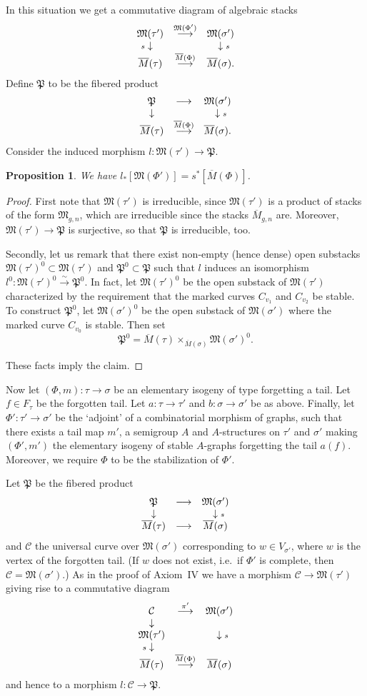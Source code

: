 \documentclass[11pt]{article}
\newcommand{\MM}{\mathfrak{M}}
\newcommand{\PP}{\mathfrak{P}}
\newcommand{\cC}{\mathcal{C}}
\newcommand{\comdia}[9]{
\begin{array}{ccc}
#1 & \stackrel{#2}{\longrightarrow} & #3 \\
\ldiag{#4} & #5 & \rdiag{#6} \\
#7 & \stackrel{#8}{\longrightarrow} & #9
\end{array}}
\newcommand{\iso}{\stackrel{\sim}{\rightarrow}}
\newcommand{\ldiag}[1]{\makebox[0cm]{\({\scriptstyle#1}\downarrow\phantom{\scriptstyle#1}\)}}
\newcommand{\lst}{_{\ast}}
\newcommand{\ol}{\overline}
\newcommand{\rdiag}[1]{\makebox[0cm]{\(\phantom{\scriptstyle#1}\downarrow{\scriptstyle#1}\)}}
\newcommand{\upst}{^{\ast}}
\theoremstyle{plain}
\newtheorem{prop}{Proposition}
\theoremstyle{remark}
\newenvironment{pf}{\begin{proof}}{\end{proof}}
\theoremstyle{plain}
\theoremstyle{definition}
\theoremstyle{remark}
\begin{document}
In this situation we get a commutative diagram of algebraic stacks
\[
\comdia{\MM(\tau')}{\MM(\Phi')}{\MM(\sigma')}{ s}{}{
s}{\ol{M}(\tau)}{\ol{M}(\Phi)}{\ol{M}(\sigma).}
\]
Define \(\PP\) to be the fibered product
\[
\comdia{\PP}{}{\MM(\sigma')}{ }{}{
s}{\ol{M}(\tau)}{\ol{M}(\Phi)}{\ol{M}(\sigma).}
\]
Consider the induced morphism \(l:\MM(\tau')\to\PP\).

\begin{prop} \label{evfa}
We have \(l\lst[\MM(\Phi')]=s\upst[\ol{M}(\Phi)]\).
\end{prop}
\begin{pf}
First note that \(\MM(\tau')\) is irreducible, since \(\MM(\tau')\) is a
product of stacks of the form \(\MM_{g,n}\), which are irreducible since
the stacks \(\ol{M}_{g,n}\) are. Moreover, \(\MM(\tau')\to\PP\) is
surjective, so that \(\PP\) is irreducible, too.

Secondly, let us remark that there exist non-empty (hence dense) open
substacks \(\MM(\tau')^0\subset\MM(\tau')\) and \(\PP^0\subset\PP\) such
that \(l\) induces an isomorphism \(l^0:\MM(\tau')^0\iso\PP^0\). In fact,
let \(\MM(\tau')^0\) be the open substack of \(\MM(\tau')\) characterized
by the requirement that the marked curves \(C_{v_1}\) and \(C_{v_2}\) be
stable. To construct \(\PP^0\), let \(\MM(\sigma')^0\) be the open
substack of \(\MM(\sigma')\) where the marked curve \(C_{v_0}\) is stable.
Then set
\[
\PP^0=\ol{M}(\tau)\times_{\ol{M}(\sigma)}\MM(\sigma')^0.
\]

These facts imply the claim.
\end{pf}

Now let \((\Phi,m):\tau\to \sigma\) be an elementary isogeny of type
forgetting a tail. Let \(f\in F_{\tau}\) be the forgotten tail. Let
\(a:\tau\to\tau'\) and \(b:\sigma\to\sigma'\) be as above. Finally, let
\(\Phi':\tau'\to\sigma'\) be the `adjoint' of a combinatorial morphism
of graphs, such that there exists a tail map \(m'\), a semigroup \(A\) and
\(A\)-structures on \(\tau'\) and \(\sigma'\) making \((\Phi',m')\) the
elementary isogeny of stable \(A\)-graphs forgetting the tail \(a(f)\).
Moreover, we require \(\Phi\) to be the stabilization of \(\Phi'\).

Let \(\PP\) be the fibered product
\[
\comdia{\PP}{}{\MM(\sigma')}{}{}{s}{\ol{M}(\tau)}{}{\ol{M}(\sigma)}
\]
and \(\cC\) the universal curve over \(\MM(\sigma')\) corresponding to
\(w\in V_{\sigma'}\), where \(w\) is the vertex of the forgotten tail. (If
\(w\) does not exist, i.e.\ if \(\Phi'\) is complete, then
\(\cC=\MM(\sigma')\).) As
in the proof of Axiom~IV we have a morphism \(\cC\rightarrow\MM(\tau')\)
giving rise to a commutative diagram
\[
\begin{array}{ccc}
\cC & \stackrel{\pi'}{\longrightarrow} & \MM(\sigma') \\
\ldiag{} & & \\
\MM(\tau') & & \rdiag{s} \\
\ldiag{s} & & \\
\ol{M}(\tau) & \stackrel{\ol{M}(\Phi)}{\longrightarrow} &
\ol{M}(\sigma)
\end{array}
\]
and hence to a morphism \(l:\cC\rightarrow\PP\).
\end{document}
